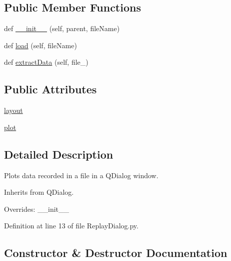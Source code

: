 \subsection*{Public Member Functions}
\begin{DoxyCompactItemize}
\item 
def \mbox{\hyperlink{classwindshape_1_1gui_1_1dialogs_1_1_replay_dialog_1_1_replay_dialog_a246e5a6be9bd7ab2da465b3dae2f49e8}{\+\_\+\+\_\+init\+\_\+\+\_\+}} (self, parent, file\+Name)
\item 
def \mbox{\hyperlink{classwindshape_1_1gui_1_1dialogs_1_1_replay_dialog_1_1_replay_dialog_ac0e3e46a05475732ed51c2da6874718e}{load}} (self, file\+Name)
\item 
def \mbox{\hyperlink{classwindshape_1_1gui_1_1dialogs_1_1_replay_dialog_1_1_replay_dialog_ad8259d3892a7652ecae975b973e73294}{extract\+Data}} (self, file\+\_\+)
\end{DoxyCompactItemize}
\subsection*{Public Attributes}
\begin{DoxyCompactItemize}
\item 
\mbox{\hyperlink{classwindshape_1_1gui_1_1dialogs_1_1_replay_dialog_1_1_replay_dialog_a02d908358d4ae112c11cddc979ad81b5}{layout}}
\item 
\mbox{\hyperlink{classwindshape_1_1gui_1_1dialogs_1_1_replay_dialog_1_1_replay_dialog_a0a2d36aafb1963c1c6ed459d5aa202ae}{plot}}
\end{DoxyCompactItemize}


\subsection{Detailed Description}
\begin{DoxyVerb}Plots data recorded in a file in a QDialog window.

Inherits from QDialog.

Overrides: __init__
\end{DoxyVerb}
 

Definition at line 13 of file Replay\+Dialog.\+py.



\subsection{Constructor \& Destructor Documentation}
\mbox{\label{classwindshape_1_1gui_1_1dialogs_1_1_replay_dialog_1_1_replay_dialog_a246e5a6be9bd7ab2da465b3dae2f49e8}} 
